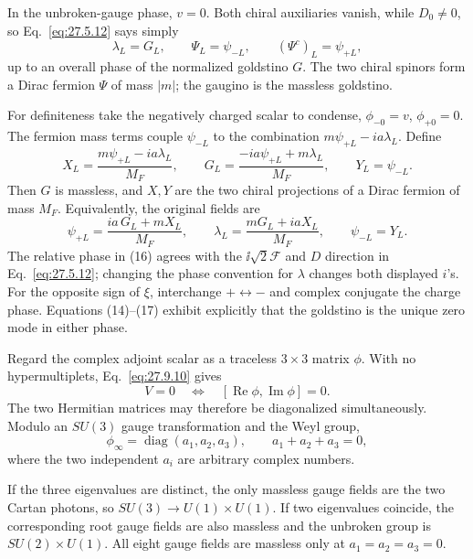 \begin{enumerate}
  In the unbroken-gauge phase, \(v=0\).  Both chiral auxiliaries vanish,
  while \(D_0\ne0\), so Eq.~\eqref{eq:27.5.12} says simply
  \[
    \lambda_L=G_L,\qquad
    \Psi_L=\psi_{-L},\qquad
    (\Psi^c)_L=\psi_{+L},
    \tag{15}
  \]
  up to an overall phase of the normalized goldstino \(G\).
  The two chiral spinors form a Dirac fermion \(\Psi\) of mass \(|m|\);
  the gaugino is the massless goldstino.

  For definiteness take the negatively charged scalar to condense,
  \(\phi_{-0}=v\), \(\phi_{+0}=0\).  The fermion mass terms couple
  \(\psi_{-L}\) to the combination
  \(m\psi_{+L}-ia\lambda_L\).  Define
  \[
    X_L=\frac{m\psi_{+L}-ia\lambda_L}{M_F},\qquad
    G_L=\frac{-ia\psi_{+L}+m\lambda_L}{M_F},\qquad
    Y_L=\psi_{-L}.
    \tag{16}
  \]
  Then \(G\) is massless, and \(X,Y\) are the two chiral projections of a
  Dirac fermion of mass \(M_F\).  Equivalently, the original fields are
  \[
    \psi_{+L}=\frac{ia\,G_L+mX_L}{M_F},\qquad
    \lambda_L=\frac{mG_L+iaX_L}{M_F},\qquad
    \psi_{-L}=Y_L .
    \tag{17}
  \]
  The relative phase in (16) agrees with the \(\ii\sqrt2\mathcal F\) and
  \(D\) direction in Eq.~\eqref{eq:27.5.12}; changing the phase convention
  for \(\lambda\) changes both displayed \(i\)'s.  For the opposite sign of
  \(\xi\), interchange \(+\leftrightarrow-\) and complex conjugate the
  charge phase.  Equations (14)--(17) exhibit explicitly that the
  goldstino is the unique zero mode in either phase.

  Regard the complex adjoint scalar as a traceless \(3\times3\) matrix
  \(\phi\).  With no hypermultiplets, Eq.~\eqref{eq:27.9.10} gives
  \[
    V=0\quad\Longleftrightarrow\quad
    [\operatorname{Re}\phi,\operatorname{Im}\phi]=0.
    \tag{18}
  \]
  The two Hermitian matrices may therefore be diagonalized simultaneously.
  Modulo an \(SU(3)\) gauge transformation and the Weyl group,
  \[
    \phi_\infty=\operatorname{diag}(a_1,a_2,a_3),\qquad
    a_1+a_2+a_3=0,
    \tag{19}
  \]
  where the two independent \(a_i\) are arbitrary complex numbers.

  If the three eigenvalues are distinct, the only massless gauge fields are
  the two Cartan photons, so \(SU(3)\to U(1)\times U(1)\).  If two
  eigenvalues coincide, the corresponding root gauge fields are also
  massless and the unbroken group is \(SU(2)\times U(1)\).  All eight gauge
  fields are massless only at \(a_1=a_2=a_3=0\).


\end{enumerate}
